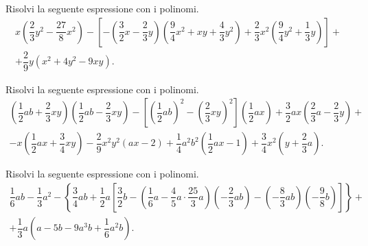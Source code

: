 \begin{esercizio}[\Ast]
Risolvi la seguente espressione con i polinomi.
\begin{multline*}
x\left(\dfrac{2}{3}y^{2}-\dfrac{27}{8}x^{2}\right)-\left[-\left(\dfrac{3}{2}x-\dfrac{2}{3}y\right)\left(\dfrac{9}{4}x^{2}+xy+\dfrac{4}{3}y^{2}\right)+\dfrac{2}{3}x^{2}\left(\dfrac{9}{4}y^{2}+\dfrac{1}{3}y\right)\right]+\\
+\dfrac{2}{9}y\left(x^{2}+4y^{2}-9xy\right).
\end{multline*}
\end{esercizio}

\begin{esercizio}[\Ast]
Risolvi la seguente espressione con i polinomi.
\begin{multline*}
\left(\dfrac{1}{2}ab+\dfrac{2}{3}xy\right)\left(\dfrac{1}{2}ab-\dfrac{2}{3}xy\right)-\left[\left(\dfrac{1}{2}ab\right)^{2}-\left(\dfrac{2}{3}xy\right)^{2}\right]\left(\dfrac{1}{2}ax\right)+\dfrac{3}{2}ax\left(\dfrac{2}{3}a-\dfrac{2}{3}y\right)+\\
-x\left(\dfrac{1}{2}ax+\dfrac{3}{4}xy\right)-\dfrac{2}{9}x^{2}y^{2}(ax-2)+\dfrac{1}{4}a^{2}b^{2}\left(\dfrac{1}{2}ax-1\right)+\dfrac{3}{4}x^{2}\left(y+\dfrac{2}{3}a\right).
\end{multline*}
\end{esercizio}

\begin{esercizio}[\Ast]
Risolvi la seguente espressione con i polinomi.
\begin{multline*}
\dfrac{1}{6}ab-\dfrac{1}{3}a^{2}-\left\{\dfrac{3}{4}ab+\dfrac{1}{2}a\left[\dfrac{3}{2}b-\left(\dfrac{1}{6}a-\dfrac{4}{5}a\cdot {\dfrac{25}{3}a}\right)\left(-{\dfrac{2}{3}ab}\right)-\left(-{\dfrac{8}{3}ab}\right)\left(-{\dfrac{9}{8}b}\right)\right]\right\}+\\
+\dfrac{1}{3}a\left(a-5b-9a^{3}b+\dfrac{1}{6}a^{2}b\right).
\end{multline*}
\end{esercizio}

